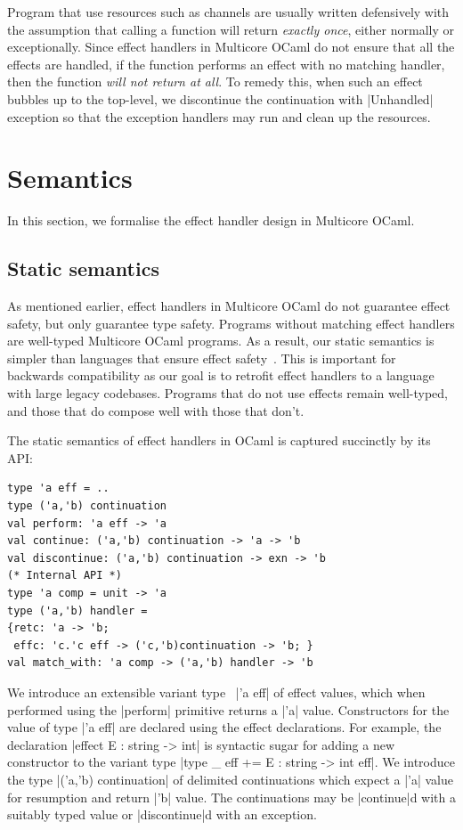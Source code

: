\documentclass[sigplan,10pt,review,anonymous]{acmart}\settopmatter{printfolios=true,printccs=false,printacmref=false}
\begin{document}
Program that use resources such as channels are usually written defensively
with the assumption that calling a function will return \emph{exactly once},
either normally or exceptionally. Since effect handlers in Multicore OCaml do
not ensure that all the effects are handled, if the function performs an effect
with no matching handler, then the function \emph{will not return at all}. To
remedy this, when such an effect bubbles up to the top-level, we discontinue
the continuation with |Unhandled| exception so that the exception handlers may
run and clean up the resources.

\section{Semantics}
\label{sec:semantics}

In this section, we formalise the effect handler design in Multicore OCaml.

\subsection{Static semantics}
\label{sec:static_semantics}

As mentioned earlier, effect handlers in Multicore OCaml do not guarantee
effect safety, but only guarantee type safety. Programs without matching effect
handlers are well-typed Multicore OCaml programs. As a result, our static
semantics is simpler than languages that ensure effect
safety~\cite{Links,Koka,Effekt,Frank,HeliumBiernacki}. This is important for
backwards compatibility as our goal is to retrofit effect handlers to a
language with large legacy codebases. Programs that do not use effects remain
well-typed, and those that do compose well with those that don't.

The static semantics of effect handlers in OCaml is captured succinctly by its
API:
\begin{lstlisting}
type 'a eff = ..
type ('a,'b) continuation
val perform: 'a eff -> 'a
val continue: ('a,'b) continuation -> 'a -> 'b
val discontinue: ('a,'b) continuation -> exn -> 'b
(* Internal API *)
type 'a comp = unit -> 'a
type ('a,'b) handler =
{retc: 'a -> 'b;
 effc: 'c.'c eff -> ('c,'b)continuation -> 'b; }
val match_with: 'a comp -> ('a,'b) handler -> 'b
\end{lstlisting}
We introduce an extensible variant type~\cite{} |'a eff| of effect values,
which when performed using the |perform| primitive returns a |'a| value.
Constructors for the value of type |'a eff| are declared using the effect
declarations. For example, the declaration |effect E : string -> int| is
syntactic sugar for adding a new constructor to the variant type
|type _ eff += E : string -> int eff|. We introduce the type
|('a,'b) continuation| of delimited continuations which expect a |'a| value for
resumption and return |'b| value. The continuations may be |continue|d with a
suitably typed value or |discontinue|d with an exception.
\end{document}
